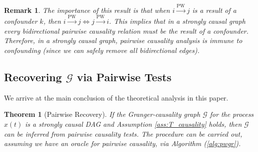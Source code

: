 \documentclass{statsoc}
\def\pwgc{\overset{\text{PW}}{\rightarrow}}  %
\def\gcg{\mathcal{G}}  %
\newtheorem{theorem}{Theorem}
\newtheorem{remark}{Remark}
\begin{document}
\begin{remark}
  The importance of this result is that when $i \pwgc j$ is a result
  of a confounder $k$, then $i \pwgc j \iff j \pwgc i$.  This
  implies that in a strongly causal graph every bidirectional pairwise
  causality relation must be the result of a confounder.  Therefore,
  in a strongly causal graph, pairwise causality analysis is
  \textit{immune to confounding} (since we can safely remove all
  bidirectional edges).
\end{remark}

\subsection{Recovering $\gcg$ via Pairwise Tests}
\label{sec:pairwise_algorithm}
We arrive at the main conclusion of the theoretical analysis in this
paper.

\begin{theorem}[Pairwise Recovery]
  \label{thm:scg_recovery}
  If the Granger-causality graph $\gcg$ for the process $x(t)$ is a
  strongly causal DAG and Assumption \ref{ass:T_causality} holds, then
  $\gcg$ can be inferred from pairwise causality tests.  The procedure
  can be carried out, assuming we have an oracle for pairwise
  causality, via Algorithm (\ref{alg:pwgr}).
\end{theorem}
\end{document}
